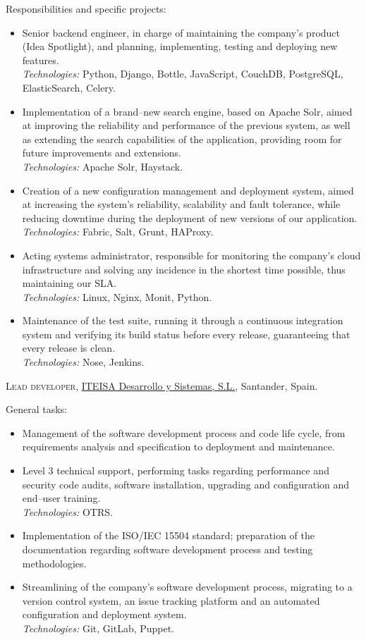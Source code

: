 \documentclass[11pt]{article}
\newcommand{\years}[1]{\marginnote{\scriptsize #1}}
\begin{document}
Responsibilities and specific projects:
\begin{itemize}
	\item  Senior backend engineer, in charge of maintaining the company's product (Idea Spotlight), and planning, implementing, testing and deploying new features.\\
	\textit{Technologies:} Python, Django, Bottle, JavaScript, CouchDB, PostgreSQL, ElasticSearch, Celery.
	\item  Implementation of a brand--new search engine, based on Apache Solr, aimed at improving the reliability and performance of the previous system, as well as extending the search capabilities of the application, providing room for future improvements and extensions.\\
	\textit{Technologies:} Apache Solr, Haystack.
	\item  Creation of a new configuration management and deployment system, aimed at increasing the system's reliability, scalability and fault tolerance, while reducing downtime during the deployment of new versions of our application.\\
	\textit{Technologies:} Fabric, Salt, Grunt, HAProxy.
	\item  Acting systems administrator, responsible for monitoring the company's cloud infrastructure and solving any incidence in the shortest time possible, thus maintaining our SLA.\\
	\textit{Technologies:} Linux, Nginx, Monit, Python.
	\item  Maintenance of the test suite, running it through a continuous integration system and verifying its build status before every release, guaranteeing that every release is clean.\\
	\textit{Technologies:} Nose, Jenkins.
\end{itemize}

\years{2011--2013}\textsc{Lead developer}, \href{http://www.iteisa.com}{ITEISA Desarrollo y Sistemas, S.L.}, Santander, Spain.

General tasks:
\begin{itemize}
	\item  Management of the software development process and code life cycle, from requirements analysis and specification to deployment and maintenance.
	\item  Level 3 technical support, performing tasks regarding performance and security code audits, software installation, upgrading and configuration and end--user training.\\
	\textit{Technologies:} OTRS.
	\item  Implementation of the ISO/IEC 15504 standard; preparation of the documentation regarding software development process and testing methodologies.
	\item  Streamlining of the company's software development process, migrating to a version control system, an issue tracking platform and an automated configuration and deployment system.\\
	\textit{Technologies:} Git, GitLab, Puppet.
\end{itemize}
\end{document}
